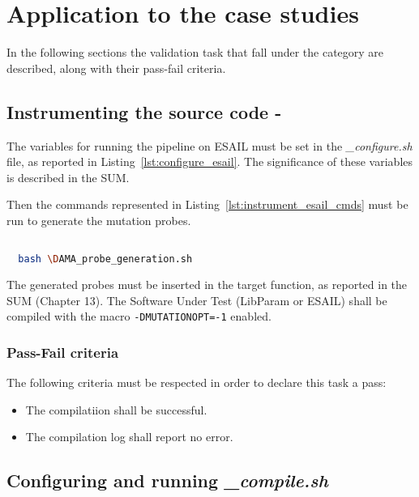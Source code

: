 \section{Application to the case studies}
\label{sec:case_studies}

In the following sections the validation task that fall under the  category are described, along with their pass-fail criteria.

\subsection{Instrumenting the source code - \DAMA}
\label{subsec:instrumenting}

The variables for running the \DAMA pipeline on ESAIL must be set in the \emph{\DAMA\_configure.sh} file, as reported in Listing~\ref{lst:configure_esail}. The significance of these variables is described in the SUM.

Then the commands represented in Listing~\ref{lst:instrument_esail_cmds} must be run to generate the mutation probes.

  \begin{lstlisting}[language=bash, label={lst:instrument_esail_cmds}]

  bash \DAMA_probe_generation.sh

  \end{lstlisting}

The generated probes must be inserted in the target function, as reported in the SUM (Chapter 13).
The Software Under Test (LibParam or ESAIL) shall be compiled with the macro \texttt{-DMUTATIONOPT=-1} enabled.

\subsubsection{Pass-Fail criteria}

The following criteria must be respected in order to declare this task a pass:
\begin{itemize}
  \item The compilatiion shall be successful.
  \item The compilation log shall report no error.
\end{itemize}

\subsection{Configuring and running \emph{\DAMA\_compile.sh}}

